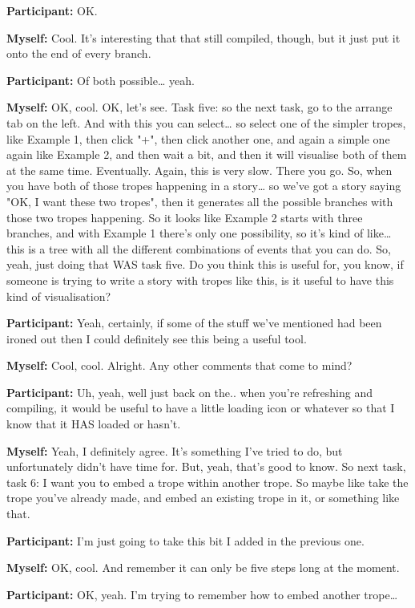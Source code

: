 \documentclass[11pt]{report}
\begin{document}
\begin{linenumbers}
\textbf{Participant:} OK.

\textbf{Myself:} Cool. It's interesting that that still compiled, though, but it just put it onto the end of every branch.

\textbf{Participant:} Of both possible\ldots{} yeah.

\textbf{Myself:} OK, cool. OK, let's see. Task five: so the next task, go to the arrange tab on the left. And with this you can select\ldots{} so select one of the simpler tropes, like Example 1, then click "+", then click another one, and again a simple one again like Example 2, and then wait a bit, and then it will visualise both of them at the same time. Eventually. Again, this is very slow. There you go. So, when you have both of those tropes happening in a story\ldots{} so we've got a story saying "OK, I want these two tropes", then it generates all the possible branches with those two tropes happening. So it looks like Example 2 starts with three branches, and with Example 1 there's only one possibility, so it's kind of like\ldots{} this is a tree with all the different combinations of events that you can do. So, yeah, just doing that WAS task five. Do you think this is useful for, you know, if someone is trying to write a story with tropes like this, is it useful to have this kind of visualisation?

\textbf{Participant:} Yeah, certainly, if some of the stuff we've mentioned had been ironed out then I could definitely see this being a useful tool.

\textbf{Myself:} Cool, cool. Alright. Any other comments that come to mind?

\textbf{Participant:} Uh, yeah, well just back on the.. when you're refreshing and compiling, it would be useful to have a little loading icon or whatever so that I know that it HAS loaded or hasn't.

\textbf{Myself:} Yeah, I definitely agree. It's something I've tried to do, but unfortunately didn't have time for. But, yeah, that's good to know. So next task, task 6: I want you to embed a trope within another trope. So maybe like take the trope you've already made, and embed an existing trope in it, or something like that.

\textbf{Participant:} I'm just going to take this bit I added in the previous one.

\textbf{Myself:} OK, cool. And remember it can only be five steps long at the moment.

\textbf{Participant:} OK, yeah. I'm trying to remember how to embed another trope\ldots{}


\end{linenumbers}
\end{document}
